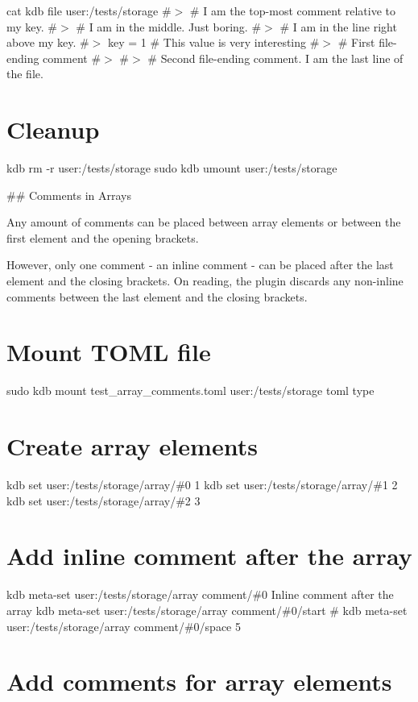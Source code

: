cat {\ttfamily kdb file user\+:/tests/storage} \#$>$ \# I am the top-\/most comment relative to my key. \#$>$ \# I am in the middle. Just boring. \#$>$ \# I am in the line right above my key. \#$>$ key = 1 \# This value is very interesting \#$>$ \# First file-\/ending comment \#$>$ \#$>$ \# Second file-\/ending comment. I am the last line of the file.\hypertarget{autotoc_md642_autotoc_md733}{}\section{Cleanup}\label{autotoc_md642_autotoc_md733}
kdb rm -\/r user\+:/tests/storage sudo kdb umount user\+:/tests/storage 
\begin{DoxyCode}
## Comments in Arrays

Any amount of comments can be placed between array elements or between the first element and the opening
       brackets.

However, only one comment - an inline comment - can be placed after the last element and the closing
       brackets.
On reading, the plugin discards any non-inline comments between the last element and the closing brackets.
\end{DoxyCode}
 \hypertarget{autotoc_md642_autotoc_md734}{}\section{Mount T\+O\+M\+L file}\label{autotoc_md642_autotoc_md734}
sudo kdb mount test\+\_\+array\+\_\+comments.\+toml user\+:/tests/storage toml type\hypertarget{autotoc_md642_autotoc_md735}{}\section{Create array elements}\label{autotoc_md642_autotoc_md735}
kdb set \textquotesingle{}user\+:/tests/storage/array/\#0\textquotesingle{} \textquotesingle{}1\textquotesingle{} kdb set \textquotesingle{}user\+:/tests/storage/array/\#1\textquotesingle{} \textquotesingle{}2\textquotesingle{} kdb set \textquotesingle{}user\+:/tests/storage/array/\#2\textquotesingle{} \textquotesingle{}3\textquotesingle{}\hypertarget{autotoc_md642_autotoc_md736}{}\section{Add inline comment after the array}\label{autotoc_md642_autotoc_md736}
kdb meta-\/set \textquotesingle{}user\+:/tests/storage/array\textquotesingle{} \textquotesingle{}comment/\#0\textquotesingle{} \textquotesingle{} Inline comment after the array\textquotesingle{} kdb meta-\/set \textquotesingle{}user\+:/tests/storage/array\textquotesingle{} \textquotesingle{}comment/\#0/start\textquotesingle{} \textquotesingle{}\#\textquotesingle{} kdb meta-\/set \textquotesingle{}user\+:/tests/storage/array\textquotesingle{} \textquotesingle{}comment/\#0/space\textquotesingle{} \textquotesingle{}5\textquotesingle{}\hypertarget{autotoc_md642_autotoc_md737}{}\section{Add comments for array elements}\label{autotoc_md642_autotoc_md737}
